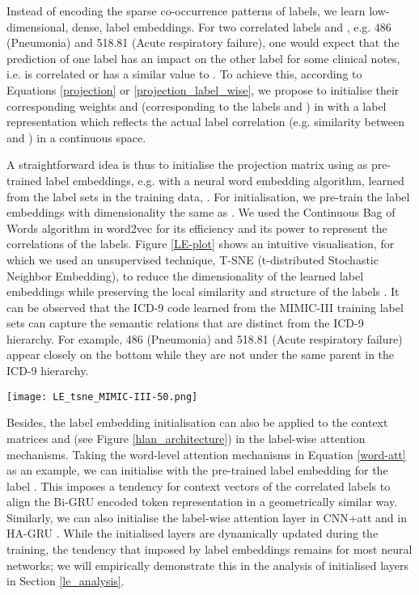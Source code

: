 \documentclass[final,5p,times,twocolumn]{elsarticle}
\begin{document}
Instead of encoding the sparse co-occurrence patterns of labels, we learn low-dimensional, dense, label embeddings. For two correlated labels  and , e.g. 486 (Pneumonia) and 518.81 (Acute respiratory failure), one would expect that the prediction of one label has an impact on the other label for some clinical notes, i.e.  is correlated or has a similar value to . To achieve this, according to Equations \ref{projection} or \ref{projection_label_wise}, we propose to initialise their corresponding weights  and  (corresponding to the labels  and ) in  with a label representation  which reflects the actual label correlation (e.g. similarity between  and ) in a continuous space.

A straightforward idea is thus to initialise the projection matrix  using  as pre-trained label embeddings, e.g. with a neural word embedding algorithm, learned from the label sets in the training data, . For initialisation, we pre-train the label embeddings  with dimensionality the same as . We used the Continuous Bag of Words algorithm in word2vec \cite{mikolov2013distributed} for its efficiency and its power to represent the correlations of the labels. Figure \ref{LE-plot} shows an intuitive visualisation, for which we used an unsupervised technique, T-SNE (t-distributed Stochastic Neighbor Embedding), to reduce the dimensionality of the learned label embeddings while preserving the local similarity and structure of the labels \cite{maaten2008tsne}. It can be observed that the ICD-9 code learned from the MIMIC-III training label sets can capture the semantic relations that are distinct from the ICD-9 hierarchy. For example, 486 (Pneumonia) and 518.81 (Acute respiratory failure) appear closely on the bottom while they are not under the same parent in the ICD-9 hierarchy.

\begin{figure*}[t]
  \centering
  \texttt{[image: LE\_tsne\_MIMIC-III-50.png]}
  \caption{The 2-dimensional T-SNE plot of word2vec Continuous Bag of Words label embeddings of the 50 ICD-9 codes in MIMIC-III-50, trained on the whole training label sets, , in MIMIC-III.}
  \label{LE-plot}
\end{figure*}

Besides, the label embedding initialisation can also be applied to the context matrices  and  (see Figure \ref{hlan_architecture}) in the label-wise attention mechanisms. Taking the word-level attention mechanisms in Equation \ref{word-att} as an example, we can initialise  with the pre-trained label embedding  for the label . This imposes a tendency for context vectors of the correlated labels to align the Bi-GRU encoded token representation  in a geometrically similar way. Similarly, we can also initialise the label-wise attention layer in CNN+att \cite{mullenbach-etal-2018-explainable} and in HA-GRU \cite{baumel2018multi}. While the initialised layers are dynamically updated during the training, the tendency that imposed by label embeddings remains for most neural networks; we will empirically demonstrate this in the analysis of initialised layers in Section \ref{le_analysis}.
\end{document}
